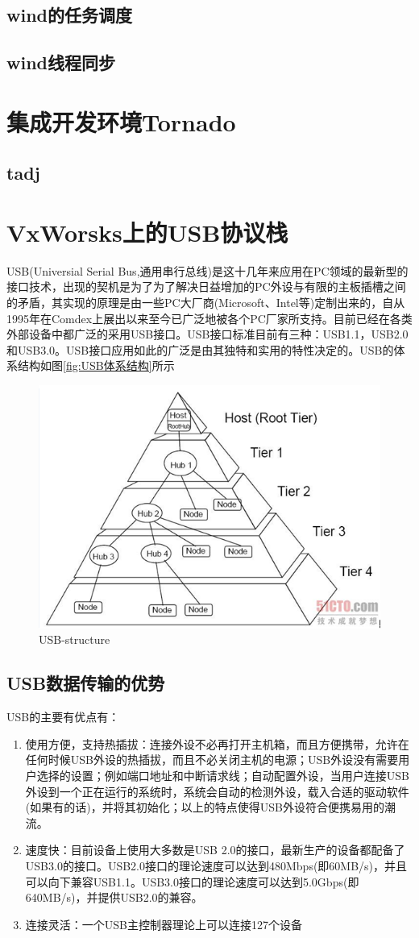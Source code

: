 \subsection{wind的任务调度}

\subsection{wind线程同步}

\section{集成开发环境Tornado}
\subsection{tadj}

\section{VxWorsks上的USB协议栈}
	USB(Universial Serial Bus,通用串行总线)是这十几年来应用在PC领域的最新型的接口技术，出现的契机是为了为了解决日益增加的PC外设与有限的主板插槽之间的矛盾，其实现的原理是由一些PC大厂商(Microsoft、Intel等)定制出来的，自从1995年在Comdex上展出以来至今已广泛地被各个PC厂家所支持。目前已经在各类外部设备中都广泛的采用USB接口。USB接口标准目前有三种：USB1.1，USB2.0和USB3.0。USB接口应用如此的广泛是由其独特和实用的特性决定的。USB的体系结构如图\autoref{fig:USB体系结构}所示
\begin{figure}[!h]
\centering
\includegraphics[width=.4\textwidth]{USB-structure.png}
\caption{USB-structure}\label{fig:USB体系结构}
\end{figure}
	

\subsection{USB数据传输的优势}
	USB的主要有优点有：
	\begin{enumerate}
	\item 使用方便，支持热插拔：连接外设不必再打开主机箱，而且方便携带，允许在任何时候USB外设的热插拔，而且不必关闭主机的电源；USB外设没有需要用户选择的设置；例如端口地址和中断请求线；自动配置外设，当用户连接USB外设到一个正在运行的系统时，系统会自动的检测外设，载入合适的驱动软件(如果有的话)，并将其初始化；以上的特点使得USB外设符合便携易用的潮流。
	\item 速度快：目前设备上使用大多数是USB 2.0的接口，最新生产的设备都配备了USB3.0的接口。USB2.0接口的理论速度可以达到480Mbps(即60MB/s)，并且可以向下兼容USB1.1。USB3.0接口的理论速度可以达到5.0Gbps(即640MB/s)，并提供USB2.0的兼容。
	\item 连接灵活：一个USB主控制器理论上可以连接127个设备
	\end{enumerate}


